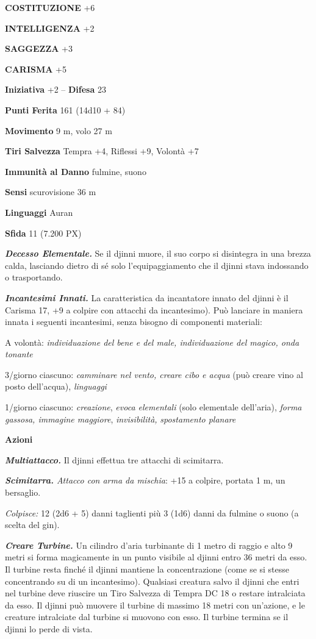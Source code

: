 \begin{multicols}{2}
	\textbf{COSTITUZIONE} +6

	\textbf{INTELLIGENZA} +2

	\textbf{SAGGEZZA} +3

	\textbf{CARISMA} +5

	\textbf{Iniziativa} +2 -- \textbf{Difesa} 23

	\textbf{Punti Ferita} 161 (14d10 + 84)

	\textbf{Movimento} 9 m, volo 27 m

	\textbf{Tiri Salvezza} Tempra +4, Riflessi +9, Volontà +7

	\textbf{Immunità al Danno} fulmine, suono

	\textbf{Sensi} scurovisione 36 m

	\textbf{Linguaggi} Auran

	\textbf{Sfida} 11 (7.200 PX)

	\textit{\textbf{Decesso Elementale.}} Se il djinni muore, il suo corpo si disintegra in una brezza calda, lasciando dietro di sé solo l'equipaggiamento che il djinni stava indossando o trasportando.

	\textit{\textbf{Incantesimi Innati.}} La caratteristica da incantatore innato del djinni è il Carisma 17, +9 a colpire con attacchi da incantesimo). Può lanciare in maniera innata i seguenti incantesimi, senza bisogno di componenti materiali:

	A volontà: \textit{individuazione del bene e del male, individuazione del magico, onda tonante}

	3/giorno ciascuno: \textit{camminare nel vento, creare cibo e acqua} (può creare vino al posto dell'acqua), \textit{linguaggi}

	1/giorno ciascuno: \textit{creazione}, \textit{evoca elementali} (solo elementale dell'aria), \textit{forma gassosa, immagine maggiore}, \textit{invisibilità,} \textit{spostamento planare}

	\textbf{Azioni}

	\textit{\textbf{Multiattacco.}} Il djinni effettua tre attacchi di
	scimitarra.

	\textit{\textbf{Scimitarra.} Attacco con arma da mischia}: +15 a colpire, portata 1 m, un bersaglio.

	\textit{Colpisce:} 12 (2d6 + 5) danni taglienti più 3 (1d6) danni da fulmine o suono (a scelta del gin).

	\textit{\textbf{Creare Turbine.}} Un cilindro d'aria turbinante di 1 metro di raggio e alto 9 metri si forma magicamente in un punto visibile al djinni entro 36 metri da esso. Il turbine resta finché il djinni mantiene la concentrazione (come se si stesse concentrando su di un incantesimo). Qualsiasi creatura salvo il djinni che entri nel turbine deve riuscire un Tiro Salvezza di Tempra DC 18 o restare intralciata da esso. Il djinni può muovere il turbine di massimo 18 metri con un'azione, e le creature intralciate dal turbine si muovono con esso. Il turbine termina se il djinni lo perde di vista.


\end{multicols}
